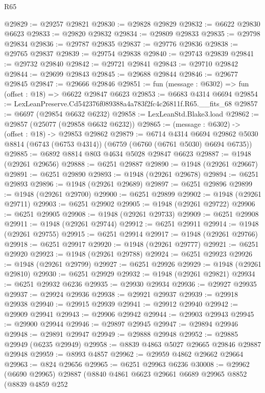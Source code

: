 \begin{lexlean}{R65}
\begin{coremodule}
{@29829 := @29257 @29821
@29830 := @29828 @29829
@29832 := @6622 @29830 @6623
@29833 := @29820 @29832
@29834 := @29809 @29833
@29835 := @29798 @29834
@29836 := @29787 @29835
@29837 := @29776 @29836
@29838 := @29765 @29837
@29839 := @29754 @29838
@29840 := @29743 @29839
@29841 := @29732 @29840
@29842 := @29721 @29841
@29843 := @29710 @29842
@29844 := @29699 @29843
@29845 := @29688 @29844
@29846 := @29677 @29845
@29847 := @29666 @29846
@29851 := fun (message : @6302) => fun (offset : @18) => @6622 @29847 @6623
@29853 := @6683 @4314 @6694
@29854 := LexLeanPreserve.Cd542376f089388a4a783f2fc4c26811f.R65.__fits_68
@29857 := @6697 (@29854 @6632 @6232)
@29858 := LexLeanStd.Blake3.load
@29862 := @29857 (@25077 (@29858 @6632 @6232))
@29865 := (message : @6302) -> (offset : @18) -> @29853 @29862
@29879 := @6714
    @4314
    @6694
    @29862
    @5030
    @8814
    (@6743 (@6753 @4314))
    (@6759 (@6760 (@6761 @5030) @6694 @6735))
@29885 := @6892 @8814 @803 @4634 @5028 @29847 @6623
@29887 := @1948 (@29261 @29656)
@29888 := @6251 @29887
@29890 := @1948 (@29261 @29667)
@29891 := @6251 @29890
@29893 := @1948 (@29261 @29678)
@29894 := @6251 @29893
@29896 := @1948 (@29261 @29689)
@29897 := @6251 @29896
@29899 := @1948 (@29261 @29700)
@29900 := @6251 @29899
@29902 := @1948 (@29261 @29711)
@29903 := @6251 @29902
@29905 := @1948 (@29261 @29722)
@29906 := @6251 @29905
@29908 := @1948 (@29261 @29733)
@29909 := @6251 @29908
@29911 := @1948 (@29261 @29744)
@29912 := @6251 @29911
@29914 := @1948 (@29261 @29755)
@29915 := @6251 @29914
@29917 := @1948 (@29261 @29766)
@29918 := @6251 @29917
@29920 := @1948 (@29261 @29777)
@29921 := @6251 @29920
@29923 := @1948 (@29261 @29788)
@29924 := @6251 @29923
@29926 := @1948 (@29261 @29799)
@29927 := @6251 @29926
@29929 := @1948 (@29261 @29810)
@29930 := @6251 @29929
@29932 := @1948 (@29261 @29821)
@29934 := @6251 @29932 @6236
@29935 := @29930 @29934
@29936 := @29927 @29935
@29937 := @29924 @29936
@29938 := @29921 @29937
@29939 := @29918 @29938
@29940 := @29915 @29939
@29941 := @29912 @29940
@29942 := @29909 @29941
@29943 := @29906 @29942
@29944 := @29903 @29943
@29945 := @29900 @29944
@29946 := @29897 @29945
@29947 := @29894 @29946
@29948 := @29891 @29947
@29949 := @29888 @29948
@29952 := @29885 @29949 (@6235 @29949)
@29958 := @8839 @4863 @5027 @29665 @29846 @29887 @29948
@29959 := @8993 @4857
@29962 := @29959 @4862 @29662 @29664
@29963 := @824 @29656
@29965 := @6251 @29963 @6236
@30008 := @29962
    (@6690 @29965)
    @29887
    (@8840
      @4861
      @6623
      @29661
      @6689
      @29965
      @8852
      (@8839
        @4859
        @252
}
\end{coremodule}
\end{lexlean}

